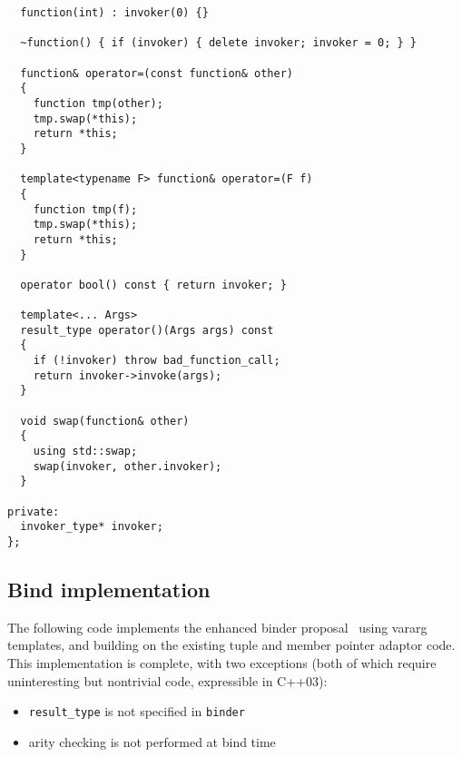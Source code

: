 \documentclass{article}
\begin{document}
\begin{verbatim}
  function(int) : invoker(0) {}
  
  ~function() { if (invoker) { delete invoker; invoker = 0; } }

  function& operator=(const function& other)
  {
    function tmp(other);
    tmp.swap(*this);
    return *this;
  }
  
  template<typename F> function& operator=(F f)
  {
    function tmp(f);
    tmp.swap(*this);
    return *this;
  }
  
  operator bool() const { return invoker; }

  template<... Args>
  result_type operator()(Args args) const
  {
    if (!invoker) throw bad_function_call;
    return invoker->invoke(args);
  }
  
  void swap(function& other)
  {
    using std::swap;
    swap(invoker, other.invoker);
  }
  
private:
  invoker_type* invoker;
};
\end{verbatim}
\normalsize

\subsection{Bind implementation}
The following code implements the enhanced binder
proposal~\cite{Dimov03b} using vararg templates, and building on the
existing tuple and member pointer adaptor code. This implementation is
complete, with two exceptions (both of which require uninteresting but
nontrivial code, expressible in C++03):
\begin{itemize}
  \item {\tt result\_type} is not specified in {\tt binder}
  \item arity checking is not performed at bind time
\end{itemize}
\end{document}
